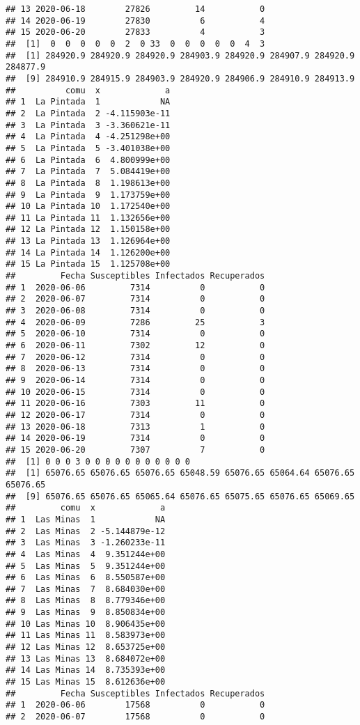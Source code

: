 \documentclass[
]{article}
\begin{document}
\begin{verbatim}
## 13 2020-06-18        27826         14           0
## 14 2020-06-19        27830          6           4
## 15 2020-06-20        27833          4           3
##  [1]  0  0  0  0  0  2  0 33  0  0  0  0  0  4  3
##  [1] 284920.9 284920.9 284920.9 284903.9 284920.9 284907.9 284920.9 284877.9
##  [9] 284910.9 284915.9 284903.9 284920.9 284906.9 284910.9 284913.9
##          comu  x             a
## 1  La Pintada  1            NA
## 2  La Pintada  2 -4.115903e-11
## 3  La Pintada  3 -3.360621e-11
## 4  La Pintada  4 -4.251298e+00
## 5  La Pintada  5 -3.401038e+00
## 6  La Pintada  6  4.800999e+00
## 7  La Pintada  7  5.084419e+00
## 8  La Pintada  8  1.198613e+00
## 9  La Pintada  9  1.173759e+00
## 10 La Pintada 10  1.172540e+00
## 11 La Pintada 11  1.132656e+00
## 12 La Pintada 12  1.150158e+00
## 13 La Pintada 13  1.126964e+00
## 14 La Pintada 14  1.126200e+00
## 15 La Pintada 15  1.125708e+00
##         Fecha Susceptibles Infectados Recuperados
## 1  2020-06-06         7314          0           0
## 2  2020-06-07         7314          0           0
## 3  2020-06-08         7314          0           0
## 4  2020-06-09         7286         25           3
## 5  2020-06-10         7314          0           0
## 6  2020-06-11         7302         12           0
## 7  2020-06-12         7314          0           0
## 8  2020-06-13         7314          0           0
## 9  2020-06-14         7314          0           0
## 10 2020-06-15         7314          0           0
## 11 2020-06-16         7303         11           0
## 12 2020-06-17         7314          0           0
## 13 2020-06-18         7313          1           0
## 14 2020-06-19         7314          0           0
## 15 2020-06-20         7307          7           0
##  [1] 0 0 0 3 0 0 0 0 0 0 0 0 0 0 0
##  [1] 65076.65 65076.65 65076.65 65048.59 65076.65 65064.64 65076.65 65076.65
##  [9] 65076.65 65076.65 65065.64 65076.65 65075.65 65076.65 65069.65
##         comu  x             a
## 1  Las Minas  1            NA
## 2  Las Minas  2 -5.144879e-12
## 3  Las Minas  3 -1.260233e-11
## 4  Las Minas  4  9.351244e+00
## 5  Las Minas  5  9.351244e+00
## 6  Las Minas  6  8.550587e+00
## 7  Las Minas  7  8.684030e+00
## 8  Las Minas  8  8.779346e+00
## 9  Las Minas  9  8.850834e+00
## 10 Las Minas 10  8.906435e+00
## 11 Las Minas 11  8.583973e+00
## 12 Las Minas 12  8.653725e+00
## 13 Las Minas 13  8.684072e+00
## 14 Las Minas 14  8.735393e+00
## 15 Las Minas 15  8.612636e+00
##         Fecha Susceptibles Infectados Recuperados
## 1  2020-06-06        17568          0           0
## 2  2020-06-07        17568          0           0

\end{verbatim}
\end{document}
